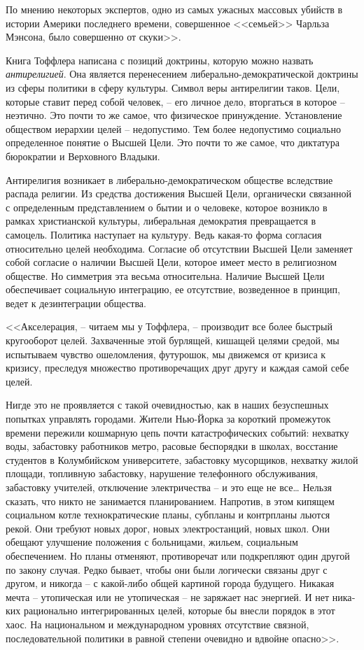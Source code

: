 \documentclass{book}
\begin{document}
По мнению некоторых экспертов, одно из самых ужасных массовых убийств в истории Америки последнего времени, совершенное <<семьей>> Чарльза Мэнсона, было совершенно от скуки>>.%

Книга Тоффлера написана с позиций доктрины, которую мож­но назвать \textit{антирелигией}.  Она является перенесением либераль­но-демократической доктрины из сферы политики в сферу культуры. Символ веры антирелигии таков. Цели, которые ставит перед собой человек, -- его личное дело, вторгаться в которое -- неэтично. Это почти то же самое, что физическое принуждение. Установление обществом иерархии целей -- недопустимо. Тем более недопустимо социально определенное понятие о Высшей Цели. Это почти то же самое, что диктатура бюрократии и Вер­ховного Владыки.

Антирелигия возникает в либерально-демократическом об­ществе вследствие распада религии. Из средства достижения Высшей Цели, органически связанной с определенным пред­ставлением о бытии и о человеке, которое возникло в рамках христианской культуры, либеральная демократия превращает­ся в самоцель. Политика наступает на культуру. Ведь какая-то форма согласия относительно целей необходима. Согласие об отсутствии Высшей Цели заменяет собой согласие о наличии Высшей Цели, которое имеет место в религиозном обществе. Но симметрия эта весьма относительна. Наличие Высшей Цели обеспечивает социальную интеграцию, ее отсутствие, возведен­ное в принцип, ведет к дезинтеграции общества.

<<Акселерация, -- читаем мы у Тоффлера, -- производит все более быстрый кругооборот целей. Захваченные этой бурлящей, кишащей целями средой, мы испытываем чувство ошеломле­ния, футурошок, мы движемся от кризиса к кризису, пресле­дуя множество противоречащих друг другу и каждая самой себе целей.

Нигде это не проявляется с такой очевидностью, как в наших безуспешных попытках управлять городами. Жители Нью-Йорка за короткий промежуток времени пережили кошмарную цепь почти катастрофических событий: нехватку воды, забастовку работников метро, расовые беспорядки в школах, восстание студентов в Колумбийском университете, забастовку мусорщиков, нехватку жилой площади, топливную забастовку, нарушение телефонного обслуживания, забастовку учителей, отключение электричества -- и это еще не все\ldots
Нельзя сказать, что никто не занимается планированием. Напротив, в этом кипящем социальном котле технократические планы, субпланы и контрпланы льются рекой. Они требуют новых дорог, новых электростанций, новых школ. Они обещают улучшение положения с больницами, жильем, социальным обеспечением. Но планы отменяют, противоречат или подкрепляют один другой по закону случая. Редко бывает, чтобы они были логически связаны друг с другом, и никогда -- с какой-либо общей картиной города будущего. Никакая мечта -- утопиче­ская или не утопическая -- не заряжает нас энергией. И нет ника­ких рационально интегрированных целей, которые бы внесли порядок в этот хаос. На национальном и международном уров­нях отсутствие связной, последовательной политики в равной степени очевидно и вдвойне опасно>>.%
\end{document}
